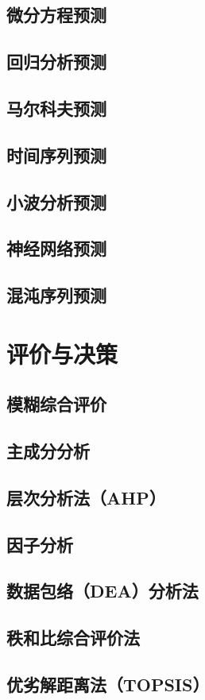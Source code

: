 \documentclass[openany]{progbookcn}
\begin{document}
\section{微分方程预测}
\section{回归分析预测}
\section{马尔科夫预测}
\section{时间序列预测}
\section{小波分析预测}
\section{神经网络预测}
\section{混沌序列预测}
\chapter{评价与决策}
\section{模糊综合评价}
\section{主成分分析}
\section{层次分析法（AHP）}
\section{因子分析}
\section{数据包络（DEA）分析法}
\section{秩和比综合评价法}
\section{优劣解距离法（TOPSIS）}
\end{document}
